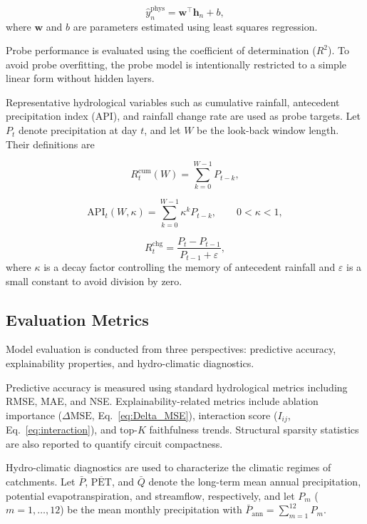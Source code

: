 \documentclass[11pt]{article}
\begin{document}
\begin{equation}
    \hat{y}_n^{\mathrm{phys}}=\mathbf{w}^{\top}\mathbf{h}_n+b,
\end{equation}
where $\mathbf{w}$ and $b$ are parameters estimated using least squares regression.

Probe performance is evaluated using the coefficient of determination ($R^2$). To avoid probe overfitting, the probe model is intentionally restricted to a simple linear form without hidden layers.

Representative hydrological variables such as cumulative rainfall\cite{PIRONE2023128949}, antecedent precipitation index (API)\cite{CAMELS}, and rainfall change rate are used as probe targets. Let $P_t$ denote precipitation at day $t$, and let $W$ be the look-back window length. Their definitions are

\begin{equation}
    R^{\mathrm{cum}}_t(W)=\sum_{k=0}^{W-1} P_{t-k},
\end{equation}

\begin{equation}
    \mathrm{API}_t(W,\kappa)=\sum_{k=0}^{W-1}\kappa^{k}P_{t-k}, \qquad 0<\kappa<1,
\end{equation}

\begin{equation}
    R^{\mathrm{chg}}_t=\frac{P_t-P_{t-1}}{P_{t-1}+\varepsilon},
\end{equation}
where $\kappa$ is a decay factor controlling the memory of antecedent rainfall and $\varepsilon$ is a small constant to avoid division by zero.

\subsection{Evaluation Metrics}

Model evaluation is conducted from three perspectives: predictive accuracy, explainability properties, and hydro-climatic diagnostics.

Predictive accuracy is measured using standard hydrological metrics including RMSE\cite{WRR_RMSE}, MAE\cite{WRR_MAE}, and NSE\cite{WRR_NSE}. Explainability-related metrics include ablation importance ($\Delta\mathrm{MSE}$, Eq.~\ref{eq:Delta_MSE}), interaction score ($I_{ij}$, Eq.~\ref{eq:interaction}), and top-$K$ faithfulness\cite{7552539} trends. Structural sparsity statistics are also reported to quantify circuit compactness.

Hydro-climatic diagnostics are used to characterize the climatic regimes of catchments. Let $\bar{P}$, $\overline{\mathrm{PET}}$, and $\bar{Q}$ denote the long-term mean annual precipitation, potential evapotranspiration, and streamflow, respectively, and let $P_m$ ($m=1,\dots,12$) be the mean monthly precipitation with $\bar{P}_{\mathrm{ann}}=\sum_{m=1}^{12}P_m$.
\end{document}
